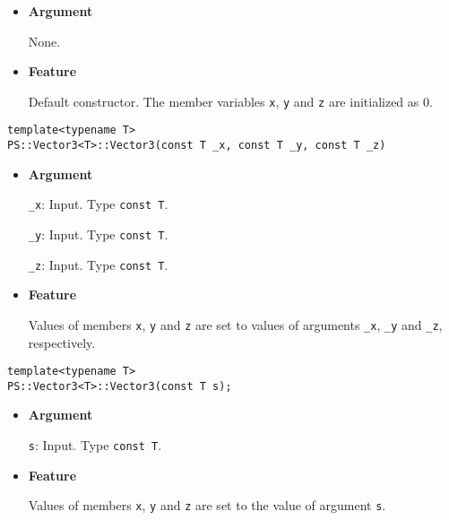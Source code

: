 \begin{itemize}

\item{{\bf Argument}}

  None.

\item{{\bf Feature}}

Default constructor. The member variables \texttt{x}, \texttt{y} and \texttt{z} are initialized as 0.

\end{itemize}

\begin{screen}
\begin{verbatim}
template<typename T>
PS::Vector3<T>::Vector3(const T _x, const T _y, const T _z)
\end{verbatim}
\end{screen}

\begin{itemize}

\item{{\bf Argument}}

\texttt{\_x}: Input. Type \texttt{const T}.

\texttt{\_y}: Input. Type \texttt{const T}.

\texttt{\_z}: Input. Type \texttt{const T}.

\item{{\bf Feature}}

Values of members \texttt{x}, \texttt{y} and \texttt{z} are set to values of arguments \texttt{\_x}, \texttt{\_y} and \texttt{\_z}, respectively.

\end{itemize}

\begin{screen}
\begin{verbatim}
template<typename T>
PS::Vector3<T>::Vector3(const T s);
\end{verbatim}
\end{screen}

\begin{itemize}

\item{{\bf Argument}}

\texttt{s}: Input. Type \texttt{const T}.

\item{{\bf Feature}}

Values of members \texttt{x}, \texttt{y} and \texttt{z} are set to the value of argument \texttt{s}.

\end{itemize}





